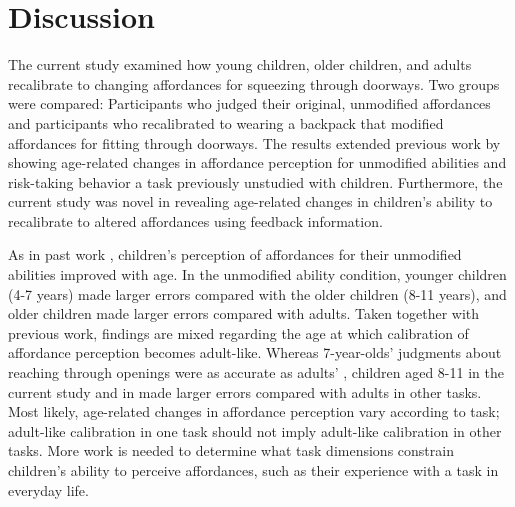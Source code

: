 \documentclass[a4paper,man,natbib,floatsintext,noextraspace]{apa6}
\begin{document}
\section{Discussion}

The current study examined how young children, older children, and adults recalibrate to changing affordances for squeezing through doorways. Two groups were compared: Participants who judged their original, unmodified affordances and participants who recalibrated to wearing a backpack that modified affordances for fitting through doorways. The results extended previous work by showing age-related changes in affordance perception for unmodified abilities and risk-taking behavior a task previously unstudied with children. Furthermore, the current study was novel in revealing age-related changes in children's ability to recalibrate to altered affordances using feedback information.

As in past work \citep{Plumert95,ChildReaching,KlevbergAnderson}, children's perception of affordances for their unmodified abilities improved with age. In the unmodified ability condition, younger children (4-7 years) made larger errors compared with the older children (8-11 years), and older children made larger errors compared with adults. Taken together with previous work, findings are mixed regarding the age at which calibration of affordance perception becomes adult-like. Whereas 7-year-olds' judgments about reaching through openings were as accurate as adults' \citep{ChildReaching}, children aged 8-11 in the current study and in \cite{Plumert95} made larger errors compared with adults in other tasks. Most likely, age-related changes in affordance perception vary according to task; adult-like calibration in one task should not imply adult-like calibration in other tasks. More work is needed to determine what task dimensions constrain children's ability to perceive affordances, such as their experience with a task in everyday life. 
\end{document}
